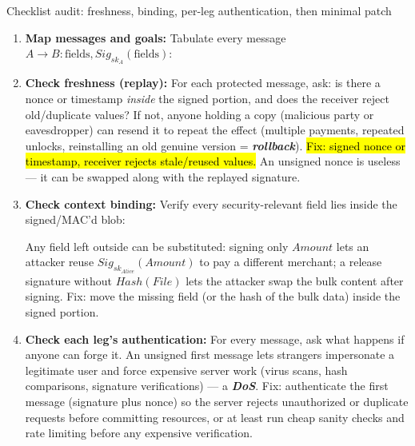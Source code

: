 \documentclass[12pt, a4paper]{article}
\newcommand{\term}[1]{\textbf{\textit{#1}}}        %
\newcommand{\imp}[1]{\hl{#1}}                       %
\begin{document}
\begin{schemebox}{Checklist audit: freshness, binding, per-leg authentication, then minimal patch}
\begin{enumerate}[label=\textbf{Step \arabic*:}, leftmargin=*]
    \item \textbf{Map messages and goals:} Tabulate every message $A \to B : \text{fields}, Sig_{sk_A}(\text{fields})$:
    \item \textbf{Check freshness (replay):} For each protected message, ask: is there a nonce or timestamp \emph{inside} the signed portion, and does the receiver reject old/duplicate values? If not, anyone holding a copy (malicious party or eavesdropper) can resend it to repeat the effect (multiple payments, repeated unlocks, reinstalling an old genuine version = \term{rollback}). \imp{Fix: signed nonce or timestamp, receiver rejects stale/reused values.} An unsigned nonce is useless --- it can be swapped along with the replayed signature.
    \item \textbf{Check context binding:} Verify every security-relevant field lies inside the signed/MAC'd blob:
Any field left outside can be substituted: signing only $Amount$ lets an attacker reuse $Sig_{sk_{Alice}}(Amount)$ to pay a different merchant; a release signature without $Hash(File)$ lets the attacker swap the bulk content after signing. Fix: move the missing field (or the hash of the bulk data) inside the signed portion.
    \item \textbf{Check each leg's authentication:} For every message, ask what happens if anyone can forge it. An unsigned first message lets strangers impersonate a legitimate user and force expensive server work (virus scans, hash comparisons, signature verifications) --- a \term{DoS}. Fix: authenticate the first message (signature plus nonce) so the server rejects unauthorized or duplicate requests before committing resources, or at least run cheap sanity checks and rate limiting before any expensive verification.

\end{enumerate}
\end{schemebox}
\end{document}
